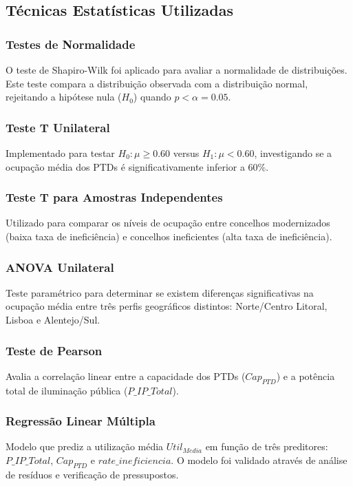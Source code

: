 \documentclass[conference]{IEEEtran}
\begin{document}
\subsection{Técnicas Estatísticas Utilizadas}

\subsubsection{Testes de Normalidade}
O teste de Shapiro-Wilk foi aplicado para avaliar a normalidade de distribuições. Este teste compara a distribuição observada com a distribuição normal, rejeitando a hipótese nula ($H_0$) quando $p < \alpha = 0.05$.

\subsubsection{Teste T Unilateral}
Implementado para testar $H_0: \mu \geq 0.60$ versus $H_1: \mu < 0.60$, investigando se a ocupação média dos PTDs é significativamente inferior a 60\%.

\subsubsection{Teste T para Amostras Independentes}
Utilizado para comparar os níveis de ocupação entre concelhos modernizados (baixa taxa de ineficiência) e concelhos ineficientes (alta taxa de ineficiência).

\subsubsection{ANOVA Unilateral}
Teste paramétrico para determinar se existem diferenças significativas na ocupação média entre três perfis geográficos distintos: Norte/Centro Litoral, Lisboa e Alentejo/Sul.

\subsubsection{Teste de Pearson}
Avalia a correlação linear entre a capacidade dos PTDs ($Cap_{PTD}$) e a potência total de iluminação pública ($P\_IP\_Total$).

\subsubsection{Regressão Linear Múltipla}
Modelo que prediz a utilização média $Util_{Media}$ em função de três preditores: $P\_IP\_Total$, $Cap_{PTD}$ e $rate\_ineficiencia$. O modelo foi validado através de análise de resíduos e verificação de pressupostos.
\end{document}
